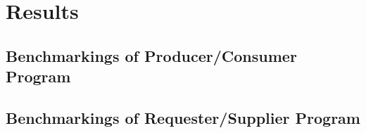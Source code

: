 \chapter{Results}\label{chapter:results}

\section{Benchmarkings of Producer/Consumer Program}
\section{Benchmarkings of Requester/Supplier Program}
